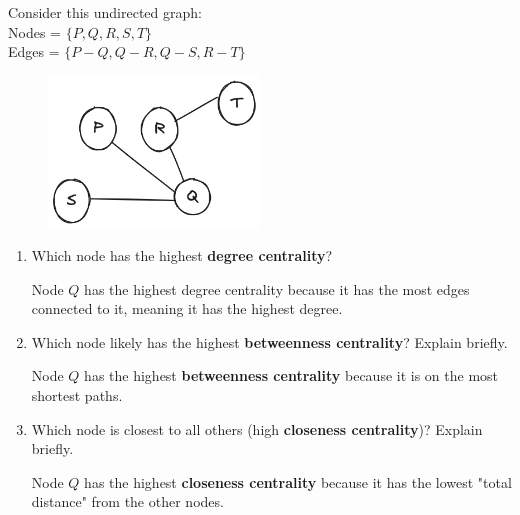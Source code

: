 \documentclass{article}
\begin{document}
Consider this undirected graph:
\\Nodes = \(\{P, Q, R, S, T\}\)
\\Edges = \( \{ P-Q, Q-R, Q-S, R-T \} \)

\begin{figure}[htbp]
    \centering
    \includegraphics[width=0.5\textwidth]{graph_2.png}
\end{figure}

\begin{enumerate}
    \item {
        Which node has the highest \textbf{degree centrality}?

        Node \(Q\) has the highest degree centrality because it has the
        most edges connected to it, meaning it has the highest degree.
    }

    \item {
        Which node likely has the highest \textbf{betweenness centrality}? 
        Explain briefly.

        Node \(Q\) has the highest \textbf{betweenness centrality} because it is 
        on the most shortest paths. 


                
    }

    \item {
        Which node is closest to all others (high \textbf{closeness centrality})? Explain briefly.

        Node \(Q\) has the highest \textbf{closeness centrality} because it has
        the lowest "total distance" from the other nodes.
                
    }
\end{enumerate}
\end{document}
